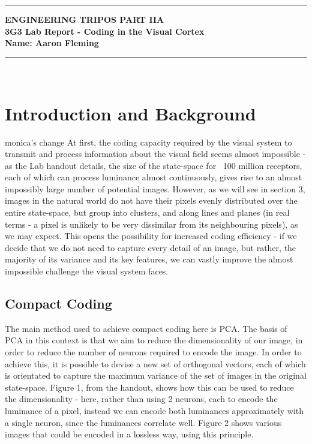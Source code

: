 \documentclass[12pt]{article}
\begin{document}
\noindent
\rule{15.7cm}{0.5mm}


\begin{center}
{\bf ENGINEERING TRIPOS PART IIA}\\
\vspace{0.5cm} {\bf 3G3 Lab Report - Coding in the Visual Cortex}\\
\vspace{0.5cm}
{\bf Name: Aaron Fleming}\\
\end{center}
\rule{15.7cm}{0.5mm}

\hfill\\

\section{Introduction and Background}
monica's change
At first, the coding capacity required by the visual system to transmit and process information about the visual field seems almost impossible - as the Lab handout details, the size of the state-space for ~100 million receptors, each of which can process luminance almost continuously, gives rise to an almost impossibly large number of potential images. However, as we will see in section 3, images in the natural world do not have their pixels evenly distributed over the entire state-space, but group into clusters, and along lines and planes (in real terms - a pixel is unlikely to be very dissimilar from its neighbouring pixels), as we may expect. This opens the possibility for increased coding efficiency - if we decide that we do not need to capture every detail of an image, but rather, the majority of its variance and its key features, we can vastly improve the almost impossible challenge the visual system faces.\\

\subsection{Compact Coding}
The main method used to achieve compact coding here is PCA. The basis of PCA in this context is that we aim to reduce the dimensionality of our image, in order to reduce the number of neurons required to encode the image. In order to achieve this, it is possible to devise a new set of orthogonal vectors, each of which is orientated to capture the maximum variance of the set of images in the original state-space. Figure 1, from the handout, shows how this can be used to reduce the dimensionality - here, rather than using 2 neurons, each to encode the luminance of a pixel, instead we can encode both luminances approximately with a single neuron, since the luminances correlate well. Figure 2 shows various images that could be encoded in a lossless way, using this principle.
\end{document}
